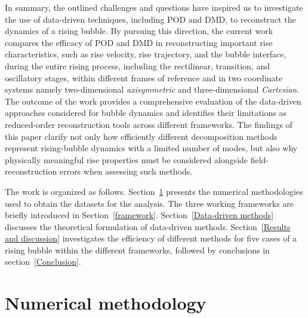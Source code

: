 \documentclass[a4paper,fleqn]{cas-sc}
\begin{document}
	In summary, the outlined challenges and questions have inspired us to investigate the use of data-driven techniques, including POD and DMD, to reconstruct the dynamics of a rising bubble. By pursuing this direction, the current work compares the efficacy of POD and DMD in reconstructing important rise characteristics, such as rise velocity, rise trajectory, and the bubble interface, during the entire rising process, including the rectilinear, transition, and oscillatory stages, within different frames of reference and in two coordinate systems namely two-dimensional \textit{axisymmetric} and three-dimensional \textit{Cartesian}. The outcome of the work provides a comprehensive evaluation of the data-driven approaches considered for bubble dynamics and identifies their limitations as reduced-order reconstruction tools across different frameworks. The findings of this paper clarify not only how efficiently different decomposition methods represent rising-bubble dynamics with a limited number of modes, but also why physically meaningful rise properties must be considered alongside field-reconstruction errors when assessing such methods.
	
	The work is organized as follows. Section~\ref{Numerical methodology} presents the numerical methodologies used to obtain the datasets for the analysis. The three working frameworks are briefly introduced in Section~\ref {framework}. Section~\ref {Data-driven methods} discusses the theoretical formulation of data-driven methods. Section~\ref{Results and discussion} investigates the efficiency of different methods for five cases of a rising bubble within the different frameworks, followed by conclusions in section~\ref{Conclusion}.
	\section{Numerical methodology}
	\label{Numerical methodology}
	
\end{document}
